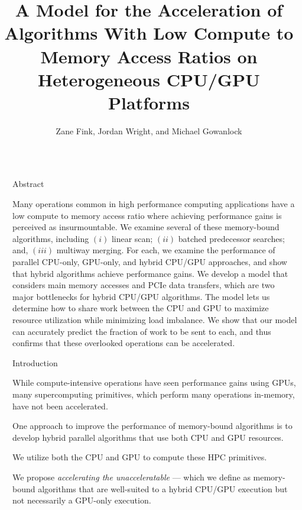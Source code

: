 \documentclass[final]{beamer}
\title{A Model for the Acceleration of Algorithms With Low Compute to Memory Access Ratios on Heterogeneous CPU/GPU Platforms}
\author{Zane Fink\inst{1}, Jordan Wright\inst{1}, and Michael Gowanlock\inst{1}}
\institute[shortinst]{\inst{1} School of Informatics, Computing, and Cyber Systems at Northern Arizona University}
\newlength{\sepwidth}
\newlength{\colwidth}
\newcommand{\separatorcolumn}{\begin{column}{\sepwidth}\end{column}}
\begin{document}
\begin{frame}[t]
\begin{columns}[t]
\separatorcolumn

\begin{column}{\colwidth}

  \begin{block}{Abstract}

   Many operations common in high performance computing applications have a low compute to memory access ratio where achieving performance gains is perceived as insurmountable.
   We examine several of these memory-bound algorithms, 
   including $(i)$ linear scan; $(ii)$ batched predecessor searches; and, $(iii)$ multiway merging. 
   For each, we examine the performance of parallel CPU-only, GPU-only, and hybrid CPU/GPU approaches, and show 
   that hybrid algorithms achieve performance gains. We develop a model that considers 
   main memory accesses and PCIe data transfers, which are two major bottlenecks for hybrid CPU/GPU algorithms. 
   The model lets us determine how to share work between the CPU and GPU to maximize resource 
   utilization while minimizing load imbalance. We show that our model can accurately predict the fraction of work 
   to be sent to each, and thus confirms that these overlooked operations can be 
   accelerated. 

  \end{block}

  \begin{block}{Introduction}
    
\begin{description}[font=$\bullet$~\normalfont\scshape\color{red!50!black}]

\item While compute-intensive operations have seen performance gains using GPUs, many supercomputing primitives, which perform many operations in-memory, have not been accelerated. 

\item One approach to improve the performance of memory-bound algorithms is to develop hybrid parallel algorithms that use both CPU and GPU resources.

\item We utilize both the CPU and GPU to compute these HPC primitives.

\item We propose \emph{accelerating the unacceleratable} --- which we define as memory-bound algorithms that are well-suited to a hybrid CPU/GPU execution but not necessarily a GPU-only execution. 


\end{description}
\end{block}
\end{column}
\end{columns}
\end{frame}
\end{document}
